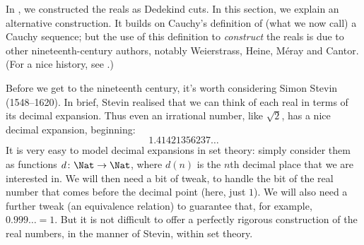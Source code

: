 \documentclass[../../../include/open-logic-section]{subfiles}
\begin{document}


In , we constructed the reals as Dedekind cuts. In
this section, we explain an alternative construction. It builds on
Cauchy's definition of (what we now call) a Cauchy sequence; but the
use of this definition to \emph{construct} the reals is due to other
nineteenth-century authors, notably Weierstrass, Heine, M\'{e}ray and
Cantor. (For a nice history, see \citeauthor{OConnorRobertson:RN}
\citeyear{OConnorRobertson:RN}.)

Before we get to the nineteenth century, it's worth considering Simon
Stevin (1548--1620). In brief, Stevin realised that we can think of
each real in terms of its decimal expansion. Thus even an irrational
number, like $\sqrt{2}$, has a nice decimal expansion, beginning:
\[
	1.41421356237\ldots
\] 
It is very easy to model decimal expansions in set theory: simply
consider them as functions $d \colon \Nat \to \Nat$, where $d(n)$ is
the $n$th decimal place that we are interested in. We will then need a
bit of tweak, to handle the bit of the real number that comes before
the decimal point (here, just $1$). We will also need a further tweak
(an equivalence relation) to guarantee that, for example, $0.999\ldots
= 1$. But it is not difficult to offer a perfectly rigorous
construction of the real numbers, in the manner of Stevin, within set
theory. 
\end{document}
